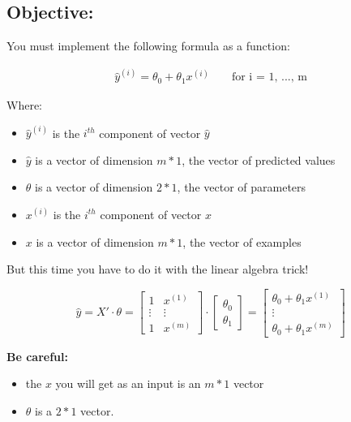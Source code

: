 \documentclass[]{article}
\begin{document}
\hypertarget{objective-2}{%
\subsection{Objective:}\label{objective-2}}

You must implement the following formula as a function:

\large

\[
\begin{matrix}
\hat{y}^{(i)} = \theta_0 + \theta_1 x^{(i)} & &\text{ for i = 1, ..., m}
\end{matrix}
\] \normalsize

Where:

\begin{itemize}
\item
  \(\hat{y}^{(i)}\) is the \(i^{th}\) component of vector \(\hat{y}\)
\item
  \(\hat{y}\) is a vector of dimension \(m * 1\), the vector of
  predicted values
\item
  \(\theta\) is a vector of dimension \(2 * 1\), the vector of
  parameters
\item
  \(x^{(i)}\) is the \(i^{th}\) component of vector \(x\)
\item
  \(x\) is a vector of dimension \(m * 1\), the vector of examples
\end{itemize}

But this time you have to do it with the linear algebra trick!

\large

\[
\hat{y} = X' \cdot \theta = 
\begin{bmatrix} 
1 & x^{(1)} \\ 
\vdots & \vdots \\ 
1 & x^{(m)} 
\end{bmatrix} 
\cdot
\begin{bmatrix}
\theta_0 \\ 
\theta_1 
\end{bmatrix} 
 = \begin{bmatrix} 
\theta_0 + \theta_1x^{(1)} \\ 
\vdots \\ 
\theta_0 + \theta_1x^{(m)} 
\end{bmatrix} 
\] \normalsize

\textbf{Be careful:}

\begin{itemize}
\item
  the \(x\) you will get as an input is an \(m * 1\) vector
\item
  \(\theta\) is a \(2 * 1\) vector.
\end{itemize}
\end{document}
